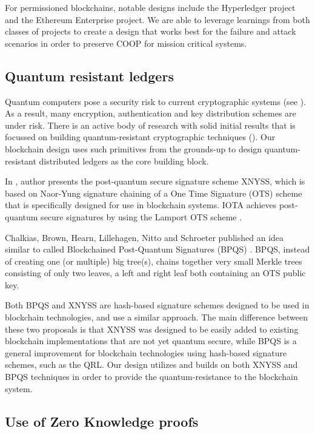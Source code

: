 For permissioned blockchains, notable designs include the Hyperledger project and the Ethereum Enterprise project. We are
able to leverage learnings from both classes of projects to create a design that works best for the failure and
attack scenarios in order to preserve COOP for mission critical systems.

\subsection{Quantum resistant ledgers}

Quantum computers pose a security risk to current cryptographic systems (see \cite{dasgupta2019}). As a result, many
encryption, authentication and key distribution schemes are under risk. There is an active body of research with solid
initial results that is focussed on building quantum-resistant cryptographic techniques (\cite{qrl2016}). Our blockchain design
uses such primitives from the grounds-up to design quantum-resistant distributed ledgers as the core building block.

In \cite{linde2018}, author presents the post-quantum secure signature scheme XNYSS, which is
based on Naor-Yung signature chaining of a One Time Signature (OTS) scheme that is specifically designed for use in blockchain
systems. IOTA \cite{iota2018} achieves post-quantum secure signatures by using the Lamport
OTS scheme \cite{lamport1979}.

Chalkias, Brown, Hearn, Lillehagen, Nitto and Schroeter published an idea similar to \cite{linde2018} called Blockchained
Post-Quantum Signatures (BPQS) \cite{bpqs}. BPQS, instead of creating one (or multiple) big tree(s), chains together very small
Merkle trees consisting of only two leaves, a left and right leaf both containing an OTS public key. 

Both BPQS and XNYSS are hash-based signature schemes designed to be used in blockchain technologies, and use a similar
approach. The main difference between these two proposals is that XNYSS was designed to be easily added to existing
blockchain implementations that are not yet quantum secure, while BPQS is a general improvement for blockchain
technologies using hash-based signature schemes, such as the QRL. Our design utilizes and builds on both XNYSS and BPQS
techniques in order to provide the quantum-resistance to the blockchain system.

\subsection{Use of Zero Knowledge proofs}

